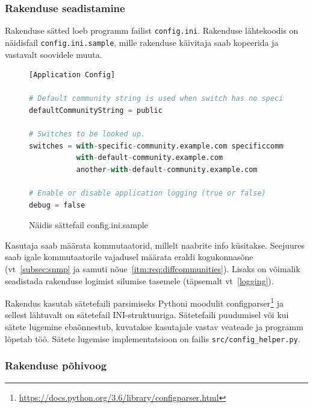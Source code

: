 \documentclass[12pt]{article}
\begin{document}
\subsubsection{Rakenduse seadistamine}
Rakenduse sätted loeb programm failist \texttt{config.ini}.
Rakenduse lähtekoodis on näidisfail \texttt{config.ini.sample}, mille rakenduse käivitaja
saab kopeerida ja vastavalt soovidele muuta.

\begin{figure} [htb]
\begin{lstlisting}[language=Python]
[Application Config]

# Default community string is used when switch has no specific community string set
defaultCommunityString = public

# Switches to be looked up.
switches = with-specific-community.example.com specificcommunity
           with-default-community.example.com
           another-with-default-community.example.com

# Enable or disable application logging (true or false)
debug = false
\end{lstlisting}
\caption{Näidis sättefail config.ini.sample}
\end{figure}

Kasutaja saab määrata kommutaatorid, millelt naabrite info küsitakse.
Seejuures saab igale kommutaatorile vajadusel määrata eraldi kogukonnasõne (vt~\ref{subsec:snmp}
ja samuti nõue~\ref{itm:req:diffcommunities}).
Lisaks on võimalik seadistada rakenduse logimist silumise tasemele (täpsemalt vt~\ref{logging}).

Rakendus kasutab sätetefaili parsimiseks Pythoni moodulit
configparser\footnote{\url{https://docs.python.org/3.6/library/configparser.html}} ja sellest
lähtuvalt on sätetefail INI-struktuuriga.
Sätetefaili puudumisel või kui sätete lugemine ebaõnnestub, kuvatakse kasutajale vastav veateade
ja programm lõpetab töö.
Sätete lugemise implementatsioon on failis \texttt{src/config\_helper.py}.

\subsubsection{Rakenduse põhivoog}
\end{document}
